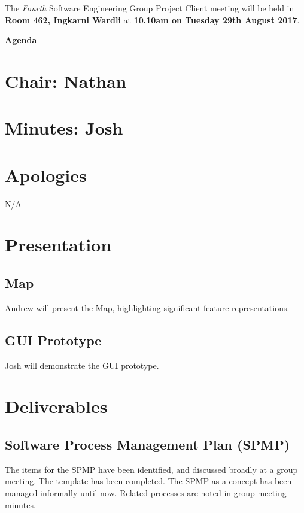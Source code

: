 \documentclass[11pt, a4paper]{article}
\newcommand{\meetingno}{Fourth}
\newcommand{\meetinglocation}{Room 462, Ingkarni Wardli} %
\newcommand{\meetingdatetime}{10.10am on Tuesday 29th August 2017} %
\newcommand{\meetingchair}{ Nathan } %
\newcommand{\meetingminutes}{ Josh }
\begin{document}
  \noindent The {\em \meetingno} Software Engineering Group Project Client meeting will be held in {\bf \meetinglocation } at {\bf \meetingdatetime }.

  \vspace*{15pt}

  \begin{center}
  \huge \bf Agenda
  \end{center}


\begin{flushleft}

  \section*{Chair: \meetingchair }
  \section*{Minutes: \meetingminutes }
  

  \vspace*{10pt}

  \section{Apologies}
  N/A %

  \section{Presentation}
  \subsection{Map}
  Andrew will present the Map, highlighting significant feature representations.
  
  \subsection{GUI Prototype}
  Josh will demonstrate the GUI prototype.
  
  \section{Deliverables}
  \subsection{Software Process Management Plan (SPMP)}
  The items for the SPMP have been identified, and discussed broadly at a group meeting. The template has been completed. The SPMP as a concept has been managed informally until now. Related processes are noted in group meeting minutes.
  

\end{flushleft}
\end{document}
